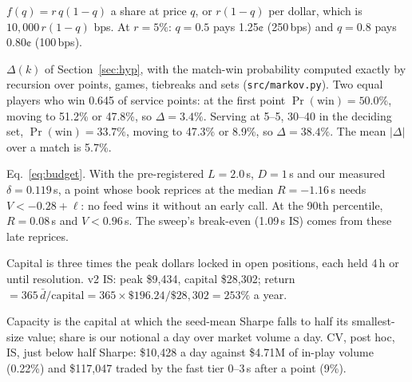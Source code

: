 \documentclass[11pt,letterpaper]{article}
\begin{document}
 \(f(q) = r\,q(1-q)\) a share at price \(q\), or \(r(1-q)\) per dollar, which is
\(10{,}000\,r(1-q)\) bps. At \(r = 5\%\): \(q = 0.5\) pays 1.25¢
(250\,bps) and \(q = 0.8\) pays 0.80¢ (100\,bps).

 \(\Delta(k)\) of Section~\ref{sec:hyp}, with the match-win probability computed exactly by recursion over points,
games, tiebreaks and sets (\texttt{src/markov.py}). Two equal players who win 0.645 of service points:
at the first point \(\Pr(\text{win}) = 50.0\%\), moving to 51.2\% or
47.8\%, so \(\Delta = 3.4\%\). Serving at 5--5, 30--40 in the deciding
set, \(\Pr(\text{win}) = 33.7\%\), moving to 47.3\% or 8.9\%, so
\(\Delta = 38.4\%\). The mean \(|\Delta|\) over a match is 5.7\%.

 Eq.~\ref{eq:budget}. With the pre-registered \(L = 2.0\)\,s, \(D =
1\)\,s and our measured \(\delta = 0.119\)\,s, a point whose book reprices at the
median \(R = −1.16\)\,s needs \(V < −0.28 + \ell\): no feed wins it
without an early call. At the 90th percentile, \(R = 0.08\)\,s and \(V < 0.96\)\,s.
The sweep's break-even (1.09\,s IS) comes from these late reprices.

 Capital is three times the peak dollars locked in open positions,
each held 4\,h or until resolution. v2 IS: peak \$9,434, capital \$28,302; return \(= 365\,\bar
d/\text{capital} = 365 \times \$196.24 / \$28,302 = 253\%\) a year.

 Capacity is the capital at which the seed-mean Sharpe falls to half its
smallest-size value; share is our notional a day over market volume a day. CV, post hoc, IS, just below half Sharpe:
\$10,428 a day against \$4.71M of in-play volume (0.22\%) and
\$117,047 traded by the fast tier 0--3\,s after a point (9\%).
\end{document}
